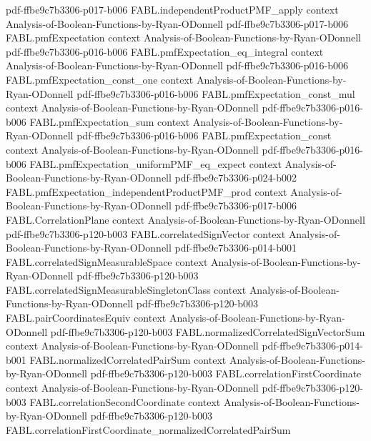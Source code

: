 \begin{theorem}
  {pdf-ffbe9c7b3306-p017-b006}
\proofstep
  {FABL.independentProductPMF_apply}
  {context}
  {Analysis-of-Boolean-Functions-by-Ryan-ODonnell}
  {pdf-ffbe9c7b3306-p017-b006}
\proofstep
  {FABL.pmfExpectation}
  {context}
  {Analysis-of-Boolean-Functions-by-Ryan-ODonnell}
  {pdf-ffbe9c7b3306-p016-b006}
\proofstep
  {FABL.pmfExpectation_eq_integral}
  {context}
  {Analysis-of-Boolean-Functions-by-Ryan-ODonnell}
  {pdf-ffbe9c7b3306-p016-b006}
\proofstep
  {FABL.pmfExpectation_const_one}
  {context}
  {Analysis-of-Boolean-Functions-by-Ryan-ODonnell}
  {pdf-ffbe9c7b3306-p016-b006}
\proofstep
  {FABL.pmfExpectation_const_mul}
  {context}
  {Analysis-of-Boolean-Functions-by-Ryan-ODonnell}
  {pdf-ffbe9c7b3306-p016-b006}
\proofstep
  {FABL.pmfExpectation_sum}
  {context}
  {Analysis-of-Boolean-Functions-by-Ryan-ODonnell}
  {pdf-ffbe9c7b3306-p016-b006}
\proofstep
  {FABL.pmfExpectation_const}
  {context}
  {Analysis-of-Boolean-Functions-by-Ryan-ODonnell}
  {pdf-ffbe9c7b3306-p016-b006}
\proofstep
  {FABL.pmfExpectation_uniformPMF_eq_expect}
  {context}
  {Analysis-of-Boolean-Functions-by-Ryan-ODonnell}
  {pdf-ffbe9c7b3306-p024-b002}
\proofstep
  {FABL.pmfExpectation_independentProductPMF_prod}
  {context}
  {Analysis-of-Boolean-Functions-by-Ryan-ODonnell}
  {pdf-ffbe9c7b3306-p017-b006}
\proofstep
  {FABL.CorrelationPlane}
  {context}
  {Analysis-of-Boolean-Functions-by-Ryan-ODonnell}
  {pdf-ffbe9c7b3306-p120-b003}
\proofstep
  {FABL.correlatedSignVector}
  {context}
  {Analysis-of-Boolean-Functions-by-Ryan-ODonnell}
  {pdf-ffbe9c7b3306-p014-b001}
\proofstep
  {FABL.correlatedSignMeasurableSpace}
  {context}
  {Analysis-of-Boolean-Functions-by-Ryan-ODonnell}
  {pdf-ffbe9c7b3306-p120-b003}
\proofstep
  {FABL.correlatedSignMeasurableSingletonClass}
  {context}
  {Analysis-of-Boolean-Functions-by-Ryan-ODonnell}
  {pdf-ffbe9c7b3306-p120-b003}
\proofstep
  {FABL.pairCoordinatesEquiv}
  {context}
  {Analysis-of-Boolean-Functions-by-Ryan-ODonnell}
  {pdf-ffbe9c7b3306-p120-b003}
\proofstep
  {FABL.normalizedCorrelatedSignVectorSum}
  {context}
  {Analysis-of-Boolean-Functions-by-Ryan-ODonnell}
  {pdf-ffbe9c7b3306-p014-b001}
\proofstep
  {FABL.normalizedCorrelatedPairSum}
  {context}
  {Analysis-of-Boolean-Functions-by-Ryan-ODonnell}
  {pdf-ffbe9c7b3306-p120-b003}
\proofstep
  {FABL.correlationFirstCoordinate}
  {context}
  {Analysis-of-Boolean-Functions-by-Ryan-ODonnell}
  {pdf-ffbe9c7b3306-p120-b003}
\proofstep
  {FABL.correlationSecondCoordinate}
  {context}
  {Analysis-of-Boolean-Functions-by-Ryan-ODonnell}
  {pdf-ffbe9c7b3306-p120-b003}
\proofstep
  {FABL.correlationFirstCoordinate_normalizedCorrelatedPairSum}

\end{theorem}
